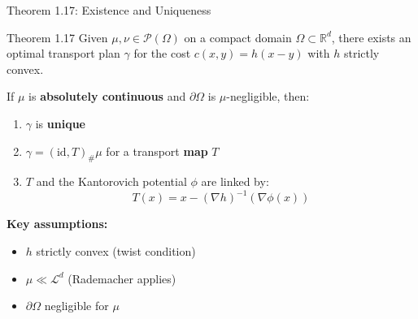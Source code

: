 \documentclass[aspectratio=169]{beamer}
\newcommand{\R}{\mathbb{R}}
\newcommand{\Pp}{\mathcal{P}}
\newcommand{\Ld}{\mathcal{L}^d}
\begin{document}
\begin{frame}{Theorem 1.17: Existence and Uniqueness}
\begin{block}{Theorem 1.17}
Given $\mu, \nu \in \Pp(\Omega)$ on a compact domain $\Omega \subset \R^d$, there exists an optimal transport plan $\gamma$ for the cost $c(x,y) = h(x-y)$ with $h$ strictly convex.

\vspace{0.2cm}
If $\mu$ is \textbf{absolutely continuous} and $\partial\Omega$ is $\mu$-negligible, then:
\begin{enumerate}
    \item $\gamma$ is \textbf{unique}
    \item $\gamma = (\text{id}, T)_\# \mu$ for a transport \textbf{map} $T$
    \item $T$ and the Kantorovich potential $\phi$ are linked by:
    \[
    \boxed{T(x) = x - (\nabla h)^{-1}(\nabla\phi(x))}
    \]
\end{enumerate}
\end{block}

\vspace{0.2cm}
\textbf{Key assumptions:}
\begin{itemize}
    \item $h$ strictly convex (twist condition)
    \item $\mu \ll \Ld$ (Rademacher applies)
    \item $\partial\Omega$ negligible for $\mu$
\end{itemize}
\end{frame}
\end{document}
